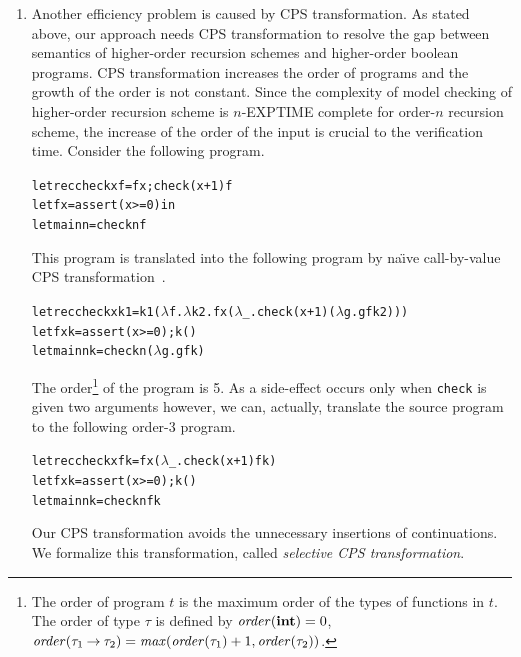 \begin{enumerate}
\item Another efficiency problem is caused by CPS transformation.  As
      stated above, our approach needs CPS transformation to resolve the
      gap between semantics of higher-order recursion schemes and
      higher-order boolean programs.  CPS transformation increases the
      order of programs and the growth of the order is not constant.
      Since the complexity of model checking of higher-order recursion
      scheme is $n$-EXPTIME complete for order-$n$ recursion scheme, the
      increase of the order of the input is crucial to the verification
      time.  Consider the following program.
\begin{alltt}
let rec check x f = f x; check (x+1) f
let f x = assert (x >= 0) in
let main n = check n f
\end{alltt}
This program is translated into the following program by
na\"{\i}ve call-by-value CPS transformation~\cite{Plotkin1975}.
\begin{alltt}
let rec check x k1 = k1 (\(\lambda\)f.\(\lambda\)k2.f x (\(\lambda\)_.check (x+1) (\(\lambda\)g.g f k2)))
let f x k = assert (x >= 0); k ()
let main n k = check n (\(\lambda\)g. g f k)
\end{alltt}
      The order\footnote{The order of program $t$ is the maximum order of the
      types of functions in $t$.  The order of type $\tau$ is defined by
      $\mathit{order}(\mathbf{int})=0$, $\mathit{order}({\tau_1}\mathbin{\rightarrow}{\tau_2}) =
      \mathit{max}(\mathit{order}(\tau_1)+1, \mathit{order}(\tau_2))$.} of the program is 5.
      As a side-effect occurs only when \texttt{check} is given two arguments however,
      we can, actually, translate the source program to the following order-3 program.
\begin{alltt}
let rec check x f k = f x (\(\lambda\)_.check (x+1) f k)
let f x k = assert (x >= 0); k ()
let main n k = check n f k
\end{alltt}
      Our CPS transformation avoids the unnecessary insertions of
      continuations.  We formalize this transformation, called
      \emph{selective CPS transformation}.


\end{enumerate}
